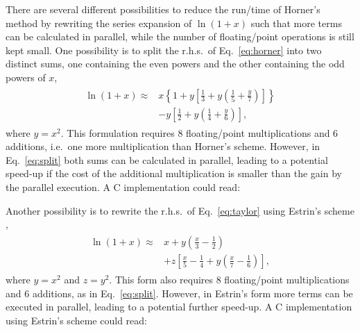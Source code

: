 \documentclass[10pt,DIV=16,twocolumn,numbers=noenddot]{scrartcl}
\begin{document}
There are several different possibilities to reduce the run\-/time of
Horner's method by rewriting the series expansion of $\ln(1+x)$ such
that more terms can be calculated in parallel, while the number of
floating\-/point operations is still kept small.  One possibility is
to split the r.h.s.\ of Eq.~\eqref{eq:horner} into two distinct sums,
one containing the even powers and the other containing the odd powers
of $x$,
%
\begin{align}
\begin{split}
  \ln(1+x) \approx{}& x \left\{1 + y \left[\frac{1}{3} + y
  \left(\frac{1}{5} + \frac{y}{7}\right)\right]\right\} \\
  &- y\left[\frac{1}{2} + y\left(\frac{1}{4} + \frac{y}{6}\right)\right],
\end{split}\label{eq:split}%
\end{align}
%
where $y=x^2$.  This formulation requires 8 floating\-/point
multiplications and 6 additions, i.e.\ one more multiplication than
Horner's scheme.  However, in Eq.~\eqref{eq:split} both sums can
be calculated in parallel, leading to a potential speed-up if the cost
of the additional multiplication is smaller than the gain by the
parallel execution.  A C implementation could read:
%

%
Another possibility is to rewrite the r.h.s.\ of Eq.~\eqref{eq:taylor}
using Estrin's scheme \cite{estrin},
%
\begin{align}
\begin{split}
  \ln(1+x) \approx{}& x + y \left(\frac{x}{3}-\frac{1}{2}\right)
    \\ &+ z \left[\frac{x}{5} - \frac{1}{4}
      + y \left(\frac{x}{7}-\frac{1}{6}\right)
    \right],
\end{split}\label{eq:estrin}%
\end{align}
%
where $y=x^2$ and $z=y^2$.  This form also requires 8 floating\-/point
multiplications and 6 additions, as in Eq.~\eqref{eq:split}.  However,
in Estrin's form more terms can be executed in parallel, leading to a
potential further speed-up.  A C implementation using Estrin's scheme
could read:
%

\end{document}
